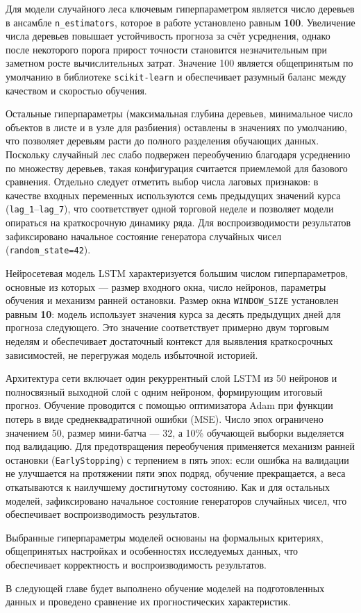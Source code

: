 Для модели случайного леса ключевым гиперпараметром является число деревьев в ансамбле \texttt{n\_estimators}, которое в работе установлено равным \textbf{100}. Увеличение числа деревьев повышает устойчивость прогноза за счёт усреднения, однако после некоторого порога прирост точности становится незначительным при заметном росте вычислительных затрат. Значение 100 является общепринятым по умолчанию в библиотеке \texttt{scikit-learn} и обеспечивает разумный баланс между качеством и скоростью обучения.

Остальные гиперпараметры (максимальная глубина деревьев, минимальное число объектов в листе и в узле для разбиения) оставлены в значениях по умолчанию, что позволяет деревьям расти до полного разделения обучающих данных. Поскольку случайный лес слабо подвержен переобучению благодаря усреднению по множеству деревьев, такая конфигурация считается приемлемой для базового сравнения. Отдельно следует отметить выбор числа лаговых признаков: в качестве входных переменных используются семь предыдущих значений курса (\texttt{lag\_1}--\texttt{lag\_7}), что соответствует одной торговой неделе и позволяет модели опираться на краткосрочную динамику ряда. Для воспроизводимости результатов зафиксировано начальное состояние генератора случайных чисел (\texttt{random\_state=42}).


Нейросетевая модель LSTM характеризуется большим числом гиперпараметров, основные из которых — размер входного окна, число нейронов, параметры обучения и механизм ранней остановки. Размер окна \texttt{WINDOW\_SIZE} установлен равным \textbf{10}: модель использует значения курса за десять предыдущих дней для прогноза следующего. Это значение соответствует примерно двум торговым неделям и обеспечивает достаточный контекст для выявления краткосрочных зависимостей, не перегружая модель избыточной историей.

Архитектура сети включает один рекуррентный слой LSTM из 50 нейронов и полносвязный выходной слой с одним нейроном, формирующим итоговый прогноз. Обучение проводится с помощью оптимизатора Adam при функции потерь в виде среднеквадратичной ошибки (MSE). Число эпох ограничено значением 50, размер мини-батча — 32, а 10\% обучающей выборки выделяется под валидацию. Для предотвращения переобучения применяется механизм ранней остановки (\texttt{EarlyStopping}) с терпением в пять эпох: если ошибка на валидации не улучшается на протяжении пяти эпох подряд, обучение прекращается, а веса откатываются к наилучшему достигнутому состоянию. Как и для остальных моделей, зафиксировано начальное состояние генераторов случайных чисел, что обеспечивает воспроизводимость результатов.

Выбранные гиперпараметры моделей основаны на формальных критериях, общепринятых настройках и особенностях исследуемых данных, что обеспечивает корректность и воспроизводимость результатов.

В следующей главе будет выполнено обучение моделей на подготовленных данных и проведено сравнение их прогностических характеристик.